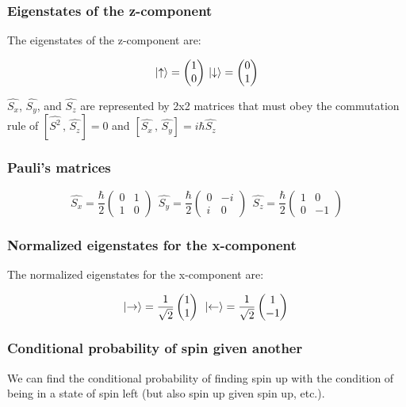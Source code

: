 		\subsubsection{Eigenstates of the z-component}
		The eigenstates of the z-component are:

		$$\ket{\uparrow}=\begin{pmatrix}1\\0\end{pmatrix}\, \ket{\downarrow}=\begin{pmatrix}0\\1\end{pmatrix}$$

		$\hat{S_x}$, $\hat{S_y}$, and $\hat{S_z}$ are represented by 2x2 matrices that must obey the commutation rule of $[\hat{S^2}\,,\,\hat{S_z}]=0$ and $[\hat{S_x}\,,\,\hat{S_y}]=i\hbar\hat{S_z}$

		\subsubsection{Pauli's matrices}

		$$\hat{S_x}=\frac{\hbar}{2}\begin{pmatrix}0&1\\1&0\end{pmatrix}\;\,\hat{S_y}=\frac{\hbar}{2}\begin{pmatrix}0&-i\\i&0\end{pmatrix}\;\,	\hat{S_z}=\frac{\hbar}{2}\begin{pmatrix}1&0\\0&-1\end{pmatrix}$$

		\subsubsection{Normalized eigenstates for the x-component}
		The normalized eigenstates for the x-component are:

		$$\ket{\rightarrow}=\frac{1}{\sqrt{2}}\begin{pmatrix}1\\1\end{pmatrix}\;\,\ket{\leftarrow}=\frac{1}{\sqrt{2}}\begin{pmatrix}1\\-1\end{pmatrix}\,$$

		\subsubsection{Conditional probability of spin given another}
		We can find the conditional probability of finding spin up with the condition of being in a state of spin left (but also spin up given spin up, etc.).

